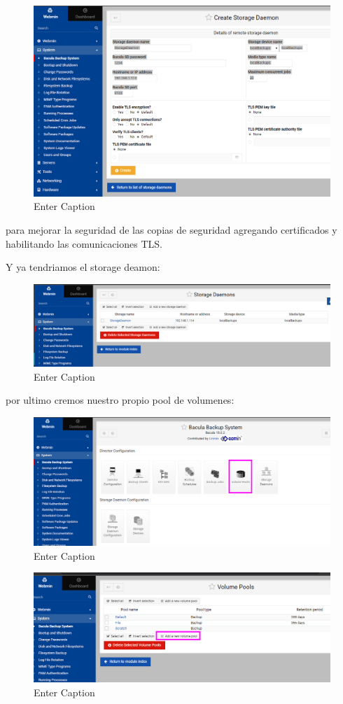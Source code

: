 \begin{figure}[H]
    \centering
    \includegraphics[width=0.5\linewidth]{instalacionBacula/storagedeamonWebmin.png}
    \caption{Enter Caption}
\end{figure}
para mejorar la seguridad de las copias de seguridad agregando certificados y habilitando las comunicaciones TLS.

Y ya tendriamos el storage deamon:
\begin{figure}[H]
    \centering
    \includegraphics[width=0.5\linewidth]{instalacionBacula/sdwebminaa.png}
    \caption{Enter Caption}
\end{figure}





por ultimo cremos nuestro propio pool de volumenes:

\begin{figure}[H]
    \centering
    \includegraphics[width=0.5\linewidth]{instalacionBacula/pollv.png}
    \caption{Enter Caption}
\end{figure}



\begin{figure}[H]
    \centering
    \includegraphics[width=0.5\linewidth]{instalacionBacula/pool22.png}
    \caption{Enter Caption}
\end{figure}

